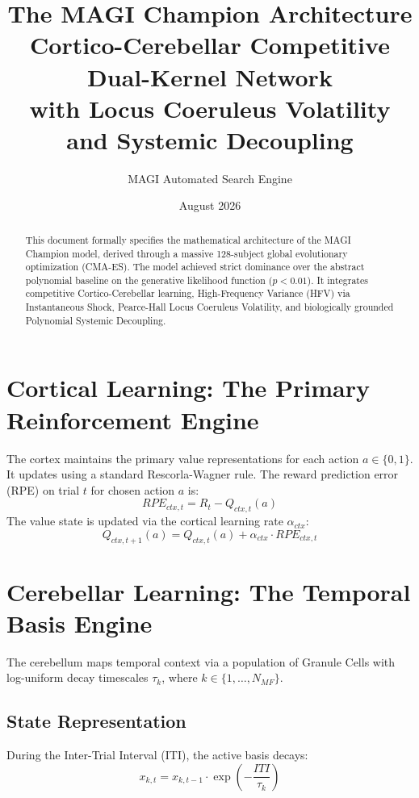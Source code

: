 ﻿\documentclass[12pt]{article}
\title{\textbf{The MAGI Champion Architecture} \\
\Large{Cortico-Cerebellar Competitive Dual-Kernel Network \\ 
with Locus Coeruleus Volatility and Systemic Decoupling}}
\author{MAGI Automated Search Engine}
\date{August 2026}
\begin{document}
\maketitle

\begin{abstract}
This document formally specifies the mathematical architecture of the MAGI Champion model, derived through a massive 128-subject global evolutionary optimization (CMA-ES). The model achieved strict dominance over the abstract polynomial baseline on the generative likelihood function ($p < 0.01$). It integrates competitive Cortico-Cerebellar learning, High-Frequency Variance (HFV) via Instantaneous Shock, Pearce-Hall Locus Coeruleus Volatility, and biologically grounded Polynomial Systemic Decoupling.
\end{abstract}

\section{Cortical Learning: The Primary Reinforcement Engine}
The cortex maintains the primary value representations for each action $a \in \{0, 1\}$. It updates using a standard Rescorla-Wagner rule. The reward prediction error (RPE) on trial $t$ for chosen action $a$ is:
\begin{equation}
    RPE_{ctx, t} = R_t - Q_{ctx, t}(a)
\end{equation}
The value state is updated via the cortical learning rate $\alpha_{ctx}$:
\begin{equation}
    Q_{ctx, t+1}(a) = Q_{ctx, t}(a) + \alpha_{ctx} \cdot RPE_{ctx, t}
\end{equation}

\section{Cerebellar Learning: The Temporal Basis Engine}
The cerebellum maps temporal context via a population of Granule Cells with log-uniform decay timescales $\tau_k$, where $k \in \{1, \dots, N_{MF}\}$.

\subsection{State Representation}
During the Inter-Trial Interval (ITI), the active basis decays:
\begin{equation}
    x_{k, t} = x_{k, t-1} \cdot \exp\left(-\frac{ITI}{\tau_k}\right)
\end{equation}
\end{document}

